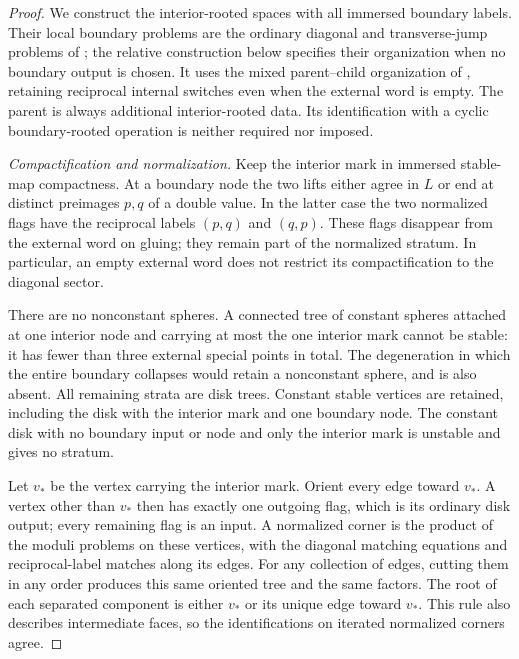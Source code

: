 \begin{proof}
We construct the interior-rooted spaces with all immersed boundary
labels.  Their local boundary problems are the ordinary diagonal and
transverse-jump problems of \cite[Sections~4--5]{AkahoJoyce}; the
relative construction below specifies their organization when no
boundary output is chosen.  It uses the mixed parent--child
organization of \cite[Propositions~16.3 and~16.14]{AFOOO2026}, retaining
reciprocal internal switches even when the external word is empty.
The parent is always additional interior-rooted data.  Its
identification with a cyclic boundary-rooted operation is neither
required nor imposed.

\emph{Compactification and normalization.}
Keep the interior mark in immersed stable-map compactness.  At a
boundary node the two lifts either agree in $L$ or end at distinct
preimages $p,q$ of a double value.  In the latter case the two
normalized flags have the reciprocal labels $(p,q)$ and $(q,p)$.
These flags disappear from the external word on gluing; they remain
part of the normalized stratum.  In particular, an empty external
word does not restrict its compactification to the diagonal sector.

There are no nonconstant spheres.  A connected tree of constant
spheres attached at one interior node and carrying at most the one
interior mark cannot be stable: it has fewer than three external
special points in total.  The degeneration in which the entire
boundary collapses would retain a nonconstant sphere, and is also
absent.  All remaining strata are disk trees.  Constant stable
vertices are retained, including the disk with the interior mark
and one boundary node.  The constant disk with no boundary input or
node and only the interior mark is unstable and gives no stratum.

Let $v_*$ be the vertex carrying the interior mark.  Orient every
edge toward $v_*$.  A vertex other than $v_*$ then has exactly one
outgoing flag, which is its ordinary disk output; every remaining
flag is an input.  A normalized corner is the product of the moduli
problems on these vertices, with the diagonal matching equations
and reciprocal-label matches along its edges.  For any collection
of edges, cutting them in any order produces this same oriented
tree and the same factors.  The root of each separated component
is either $v_*$ or its unique edge toward $v_*$.  This rule also
describes intermediate faces, so the identifications on iterated
normalized corners agree.


\end{proof}
